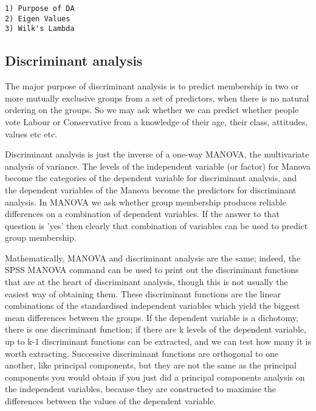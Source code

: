 
\begin{verbatim}
1) Purpose of DA
2) Eigen Values
3) Wilk's Lambda
\end{verbatim}

\subsection{Discriminant analysis}


The major purpose of discriminant analysis is to predict membership in two or more mutually exclusive groups from a set of predictors, when there is no natural ordering on the groups. So we may ask whether we can predict whether people vote Labour or Conservative from a knowledge of their age, their class, attitudes, values etc etc.

Discriminant analysis is just the inverse of a one-way MANOVA, the multivariate analysis of variance. The levels of the independent variable (or factor) for Manova become the categories of the dependent variable for discriminant analysis, and the dependent variables of the Manova become the predictors for discriminant analysis. In MANOVA we ask whether group membership produces reliable differences on a combination of dependent variables. If the answer to that question is 'yes' then clearly that combination of variables can be used to predict group membership. 

Mathematically, MANOVA and discriminant analysis are the same; indeed, the SPSS MANOVA command can be used to print out the discriminant functions that are at the heart of discriminant analysis, though this is not usually the easiest way of obtaining them. These discriminant functions are the linear combinations of the standardised independent variables which yield the biggest mean differences between the groups. If the dependent variable is a dichotomy, there is one discriminant function; if there are k levels of the dependent variable, up to k-1 discriminant functions can be extracted, and we can test how many it is worth extracting. Successive discriminant functions are orthogonal to one another, like principal components, but they are not the same as the principal components you would obtain if you just did a principal components analysis on the independent variables, because they are constructed to maximise the differences between the values of the dependent variable.

